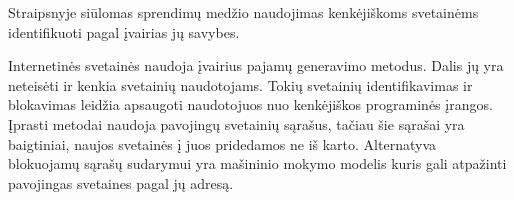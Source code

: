 
Straipsnyje  siūlomas sprendimų medžio naudojimas kenkėjiškoms svetainėms identifikuoti pagal įvairias jų
savybes.


Internetinės svetainės naudoja įvairius pajamų generavimo metodus. Dalis jų yra neteisėti ir kenkia svetainių naudotojams.
Tokių svetainių identifikavimas ir blokavimas leidžia apsaugoti naudotojuos nuo kenkėjiškos programinės įrangos. Įprasti
metodai naudoja pavojingų svetainių sąrašus, tačiau šie sąrašai yra baigtiniai, naujos svetainės į juos pridedamos ne
iš karto. Alternatyva blokuojamų sąrašų sudarymui yra mašininio mokymo modelis kuris gali atpažinti pavojingas svetaines
pagal jų adresą.



